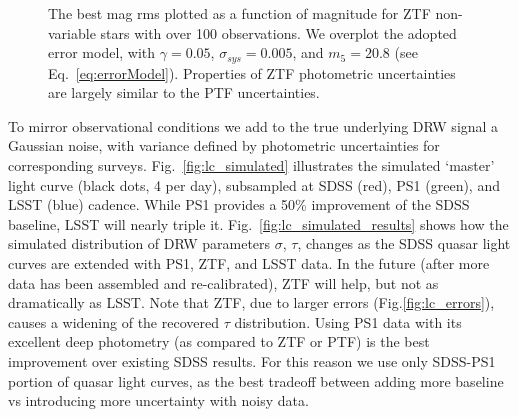 \documentclass[twocolumn]{aastex62}
\begin{document}
\begin{figure}%
\caption{The best mag rms plotted as a function of magnitude for ZTF non-variable stars with over 100 observations. We overplot the adopted error model, with $\gamma = 0.05$, $\sigma_{sys} = 0.005 $, and $m_{5} = 20.8$ (see Eq.~\ref{eq:errorModel}). Properties of ZTF photometric uncertainties are largely similar to the PTF uncertainties.}
\label{fig:ztf_errors}
\end{figure} 



\begin{figure*}%
\caption{Simulated well-sampled underlying DRW process - one of `master' light curves ($\tau=575$d, SF$_{\infty} = 0.2$ mag, 4 points per day) shown with  small black dots. To simulate observations, the cadence is degraded (subsampled) to match the ground-based cadence corresponding to real quasar data from SDSS (red), PS1 (green) segments, and simulated LSST (blue) epochs (here we use SDSS-PS1 epochs for quasar dbID=3537034). The orange `error snake' is an envelope marking the standard deviation of the fit to the data using a Gaussian process  with DRW kernel (Sec.~\ref{sec:simulation}).}
\label{fig:lc_simulated}
\end{figure*} 



To mirror observational conditions we add to the true underlying DRW signal a Gaussian noise, with variance defined by photometric uncertainties for corresponding surveys. Fig.~\ref{fig:lc_simulated} illustrates the simulated `master' light curve (black dots, 4 per day), subsampled at SDSS (red), PS1 (green), and LSST (blue) cadence. While PS1 provides a 50\% improvement of the SDSS baseline, LSST will nearly triple it. Fig.~\ref{fig:lc_simulated_results} shows how the simulated distribution of DRW parameters $\sigma$, $\tau$, changes as the SDSS quasar light curves are extended with PS1, ZTF, and LSST data. In the future (after more data has been assembled and re-calibrated), ZTF will help, but not as dramatically as LSST. Note that ZTF, due to larger errors (Fig.\ref{fig:lc_errors}), causes a widening of the recovered $\tau$ distribution. Using PS1 data with its excellent  deep photometry (as compared to ZTF or PTF) is the best improvement over existing SDSS results.  For this reason we use only SDSS-PS1 portion of quasar light curves, as the best tradeoff between adding more baseline vs introducing more uncertainty with noisy data.
\end{document}
